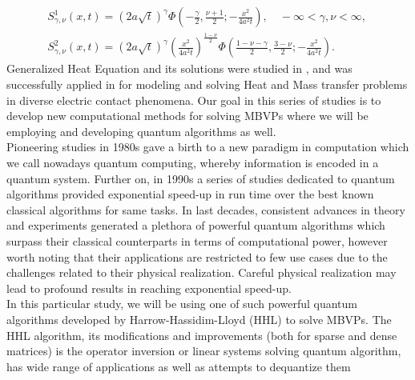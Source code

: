 \documentclass[review]{elsarticle}
\begin{document}
\begin{align}
&S_{\gamma,\nu}^{1}\left(x,t\right) = \left(2a\sqrt{t}\right)^{\gamma}\Phi\left(-\frac{\gamma}{2},\frac{\nu+1}{2};-\frac{x^{2}}{4a^{2}t}\right),\hspace{1em} -\infty<\gamma,\nu<\infty,\hspace{1em} \label{hyper1}\\[1mm]
&S_{\gamma,\nu}^{2}\left(x,t\right) = \left(2a\sqrt{t}\right)^{\gamma}\left(\frac{x^{2}}{4a^{2}t}\right)^{\frac{1-\nu}{2}}\Phi\left(\frac{1-\nu-\gamma}{2},\frac{3-\nu}{2};-\frac{x^{2}}{4a^{2}t}\right).\label{hyper2}\hspace{1em}\
\end{align}
Generalized Heat Equation and its solutions were studied in \cite{appell,widder75,haimo68,widapptransf63,brag65}, and was successfully applied in \cite{khar15holm,khar16ICEC,kharin2012, kharnovosib17} for modeling and solving Heat and Mass transfer problems in diverse electric contact phenomena. Our goal in this series of studies is to develop new computational methods for solving MBVPs where we will be employing and developing quantum algorithms as well.\\
Pioneering studies \cite{ben80,fe82} in 1980s gave a birth to a new paradigm in computation which we call nowadays quantum computing, whereby information is encoded in a quantum system. Further on, in 1990s a series of studies \cite{sho97,gro96,gro97} dedicated to quantum algorithms provided exponential speed-up in run time over the best known classical algorithms for same tasks. In last decades, consistent advances in theory and experiments generated a plethora of powerful quantum algorithms \cite{mo16} 
which surpass their classical counterparts in terms of computational power, however worth noting that their applications are restricted to few use cases due to the challenges related to their physical realization. Careful physical realization may lead to profound results in reaching exponential speed-up.\\
In this particular study, we will be using one of such powerful quantum algorithms developed by Harrow-Hassidim-Lloyd (HHL) \cite{hhl09} to solve MBVPs. The HHL algorithm, its modifications and improvements \cite{hhl09, wosnig18physrevlet,duan20physleta,abhijith18arxiv,chakraborty2018power,Dervovic2018QuantumLS} (both for sparse and dense matrices) is the operator inversion or linear systems solving quantum algorithm, has wide range of applications \cite{duan20physleta} as well as attempts to dequantize them \cite{tang18} %
\end{document}
